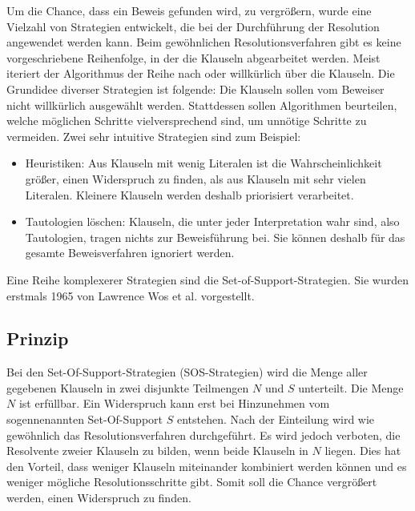 Um die Chance, dass ein Beweis gefunden wird, zu vergrößern, wurde eine Vielzahl von Strategien entwickelt, die bei der Durchführung der Resolution angewendet werden kann. Beim gewöhnlichen Resolutionsverfahren gibt es keine vorgeschriebene Reihenfolge, in der die Klauseln abgearbeitet werden. Meist iteriert der Algorithmus der Reihe nach oder willkürlich über die Klauseln. Die Grundidee diverser Strategien ist folgende: Die Klauseln sollen vom Beweiser nicht willkürlich ausgewählt werden. Stattdessen sollen Algorithmen beurteilen, welche möglichen Schritte vielversprechend sind, um unnötige Schritte zu vermeiden. Zwei sehr intuitive Strategien sind zum Beispiel:
\begin{itemize}
	\item Heuristiken: Aus Klauseln mit wenig Literalen ist die Wahrscheinlichkeit größer, einen Widerspruch zu finden, als aus Klauseln mit sehr vielen Literalen. Kleinere Klauseln werden deshalb priorisiert verarbeitet.
	\item Tautologien löschen: Klauseln, die unter jeder Interpretation wahr sind, also Tautologien, tragen nichts zur Beweisführung bei. Sie können deshalb für das gesamte Beweisverfahren ignoriert werden.
\end{itemize}

Eine Reihe komplexerer Strategien sind die Set-of-Support-Strategien. Sie wurden erstmals 1965 von Lawrence Wos et al. vorgestellt. \cite{Wos1965Sos}

		\subsection{Prinzip}
Bei den Set-Of-Support-Strategien (SOS-Strategien) wird die Menge aller gegebenen Klauseln in zwei disjunkte Teilmengen $N$ und $S$ unterteilt. Die Menge $N$ ist erfüllbar. Ein Widerspruch kann erst bei Hinzunehmen vom sogennenannten Set-Of-Support $S$ entstehen. Nach der Einteilung wird wie gewöhnlich das Resolutionsverfahren durchgeführt. Es wird jedoch verboten, die Resolvente zweier Klauseln zu bilden, wenn beide Klauseln in $N$ liegen. Dies hat den Vorteil, dass weniger Klauseln miteinander kombiniert werden können und es weniger mögliche Resolutionsschritte gibt. Somit soll die Chance vergrößert werden, einen Widerspruch zu finden.


